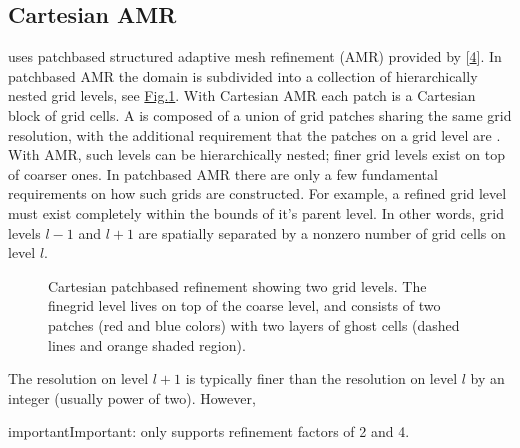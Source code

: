 \documentclass[letterpaper,10pt,english]{sphinxmanual}
\let\sphinxpxdimen\pdfpxdimen\else\newdimen\sphinxpxdimen
\begin{document}
\subsection{Cartesian AMR}
\label{\detokenize{Source/SpatialDiscretization:cartesian-amr}}
 uses patch\sphinxhyphen{}based structured adaptive mesh refinement (AMR) provided by  {[}\hyperlink{cite.ZZReferences:id82}{4}{]}.
In patch\sphinxhyphen{}based AMR the domain is subdivided into a collection of hierarchically nested grid levels, see \hyperref[\detokenize{Source/SpatialDiscretization:fig-patchbasedamr}]{Fig.\@ \ref{\detokenize{Source/SpatialDiscretization:fig-patchbasedamr}}}.
With Cartesian AMR each patch is a Cartesian block of grid cells.
A  is composed of a union of grid patches sharing the same grid resolution, with the additional requirement that the patches on a grid level are .
With AMR, such levels can be hierarchically nested; finer grid levels exist on top of coarser ones.
In patch\sphinxhyphen{}based AMR there are only a few fundamental requirements on how such grids are constructed.
For example, a refined grid level must exist completely within the bounds of it’s parent level.
In other words, grid levels \(l-1\) and \(l+1\) are spatially separated by a non\sphinxhyphen{}zero number of grid cells on level \(l\).

\begin{figure}[htb]
\centering
\capstart

\noindent\sphinxincludegraphics[width=480\sphinxpxdimen]{{PatchBasedAMR}.png}
\caption{Cartesian patch\sphinxhyphen{}based refinement showing two grid levels.
The fine\sphinxhyphen{}grid level lives on top of the coarse level, and consists of two patches (red and blue colors) with two layers of ghost cells (dashed lines and orange shaded region).}\label{\detokenize{Source/SpatialDiscretization:id6}}\label{\detokenize{Source/SpatialDiscretization:fig-patchbasedamr}}\end{figure}

The resolution on level \(l+1\) is typically finer than the resolution on level \(l\) by an integer (usually power of two).
However,

\begin{sphinxadmonition}{important}{Important:}
 only supports refinement factors of 2 and 4.
\end{sphinxadmonition}
\end{document}
